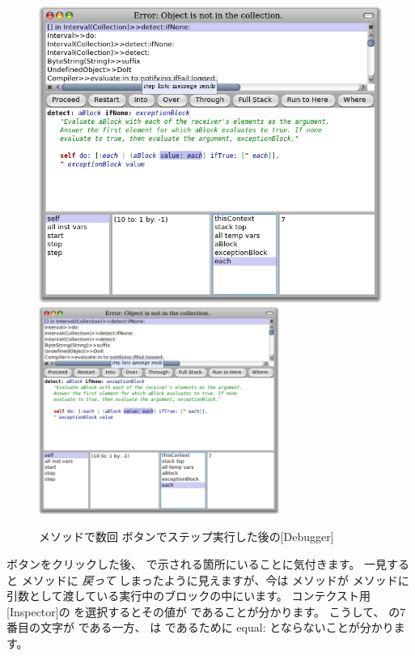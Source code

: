 \documentclass[a4paper,10pt,twoside]{book}
\begin{document}
\begin{figure}[btp]
	\begin{center}
	\ifluluelse
		{\includegraphics[width=\textwidth]{steppingIntoValue}}
		{\includegraphics[width=0.7\textwidth]{steppingIntoValue}}
	\end{center}
	\caption{ メソッドで数回  ボタンでステップ実行した後の[Debugger]}
\end{figure}

 ボタンをクリックした後、 で示される箇所にいることに気付きます。
一見すると  メソッドに \emph{戻って} しまったように見えますが、今は  メソッドが  メソッドに引数として渡している実行中のブロックの中にいます。
コンテクスト用[Inspector]の  を選択するとその値が  であることが分かります。
こうして、 の7番目の文字が  である一方、  は  であるために equal: とならないことが分かります。
\end{document}
